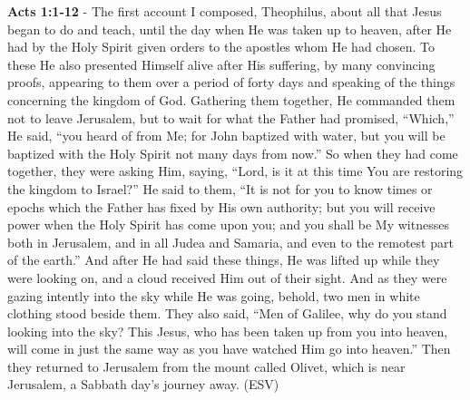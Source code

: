 \documentclass[11pt]{article}
\begin{document}
\textbf{Acts 1:1-12} - The first account I composed, Theophilus, about all that Jesus began to do and teach, until the day when He was taken up to heaven, after He had by the Holy Spirit given orders to the apostles whom He had chosen. To these He also presented Himself alive after His suffering, by many convincing proofs, appearing to them over a period of forty days and speaking of the things concerning the kingdom of God. Gathering them together, He commanded them not to leave Jerusalem, but to wait for what the Father had promised, “Which,” He said, “you heard of from Me; for John baptized with water, but you will be baptized with the Holy Spirit not many days from now.” So when they had come together, they were asking Him, saying, “Lord, is it at this time You are restoring the kingdom to Israel?” He said to them, “It is not for you to know times or epochs which the Father has fixed by His own authority; but you will receive power when the Holy Spirit has come upon you; and you shall be My witnesses both in Jerusalem, and in all Judea and Samaria, and even to the remotest part of the earth.” And after He had said these things, He was lifted up while they were looking on, and a cloud received Him out of their sight. And as they were gazing intently into the sky while He was going, behold, two men in white clothing stood beside them. They also said, “Men of Galilee, why do you stand looking into the sky? This Jesus, who has been taken up from you into heaven, will come in just the same way as you have watched Him go into heaven.” Then they returned to Jerusalem from the mount called Olivet, which is near Jerusalem, a Sabbath day’s journey away. (ESV)
\end{document}
